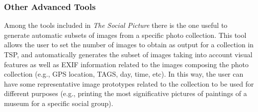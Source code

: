 \subsubsection{Other Advanced Tools}
%
Among the tools included in \textit{The Social Picture} there is the one useful to generate automatic subsets of images from a specific photo collection. This tool allows the user to set the number of images to obtain as output for a collection in TSP, and automatically generates the subset of images taking into account visual features as well as EXIF information related to the images composing the photo collection (e.g., GPS location, TAGS, day, time, etc). In this way, the user can have some representative image prototypes related to the collection to be used for different purposes (e.g., printing the most significative pictures of paintings of a museum for a specific social group).

